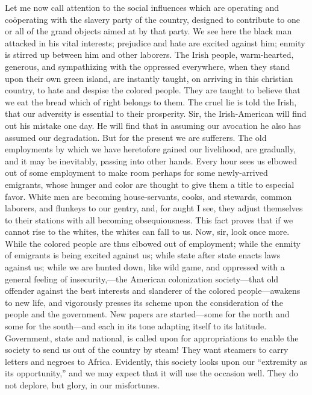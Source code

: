 Let me now call attention to the social influences which are operating
and coöperating with the slavery party of the country, designed to
contribute to one or all of the grand objects aimed at by that party. We
see here the black man attacked in his vital interests; prejudice and
hate are excited against him; enmity is stirred up between him and other
laborers. The Irish people, warm-hearted, generous, and sympathizing
with the oppressed everywhere, when they stand upon their own green
island, are instantly taught, on arriving in this christian country, to
hate and despise the colored people. They are taught to believe that we
eat the bread which of right belongs to them. The cruel lie is told the
Irish, that our adversity is essential to their prosperity. Sir, the
Irish-American will find out his mistake one day. He will find that in
assuming our avocation he also has assumed our degradation. But for the
present we are sufferers. The old employments by which we have
heretofore gained our livelihood, are gradually, and it may be
inevitably, passing into other hands. Every hour sees us elbowed out of
some employment to make room perhaps for some newly-arrived emigrants,
whose hunger and color are thought to give them a title to especial
favor. White men are becoming house-servants, cooks, and stewards,
common laborers, and flunkeys to our gentry, and, for aught I see, they
adjust themselves to their stations with all becoming obsequiousness.
This fact proves that if we cannot rise to the whites, the whites can
fall to us. Now, sir, look once more. While the colored people are thus
{\protect\hypertarget{455}{}{}}elbowed out of employment; while the
enmity of emigrants is being excited against us; while state after state
enacts laws against us; while we are hunted down, like wild game, and
oppressed with a general feeling of insecurity,---the American
colonization society---that old offender against the best interests and
slanderer of the colored people---awakens to new life, and vigorously
presses its scheme upon the consideration of the people and the
government. New papers are started---some for the north and some for the
south---and each in its tone adapting itself to its latitude.
Government, state and national, is called upon for appropriations to
enable the society to send us out of the country by steam! They want
steamers to carry letters and negroes to Africa. Evidently, this society
looks upon our ``extremity as its opportunity,'' and we may expect that
it will use the occasion well. They do not deplore, but glory, in our
misfortunes.

